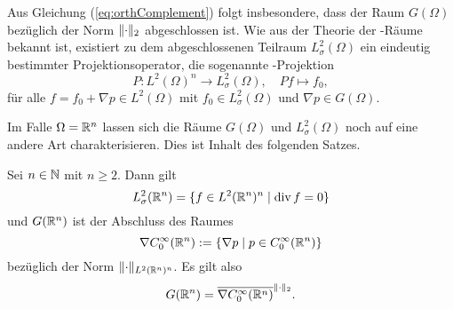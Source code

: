 Aus Gleichung (\ref{eq:orthComplement}) folgt insbesondere, dass der Raum $G(\Omega)$ bezüglich der Norm $\lVert \cdot \rVert_2$ abgeschlossen ist.
Wie aus der Theorie der \hilbert\hyp{}Räume bekannt ist, existiert zu dem abgeschlossenen Teilraum $L_\sigma^2(\Omega)$ ein eindeutig bestimmter Projektionsoperator, die sogenannte \helmholtz\hyp{}Projektion
$$
P \colon L^2(\Omega)^n \to L_\sigma^2(\Omega),\quad Pf \mapsto f_0,
$$
für alle $f = f_0 + \nabla p \in L^2(\Omega)$ mit $f_0 \in L_\sigma^2(\Omega)$ und $\nabla p \in G(\Omega)$.

Im Falle $\Omega = \mathbb{R}^n$ lassen sich die Räume $G(\Omega)$ und $L_\sigma^2(\Omega)$ noch auf eine andere Art charakterisieren.
Dies ist Inhalt des folgenden Satzes.

\begin{thm}
  Sei $n \in \mathbb{N}$ mit $n \geq 2$.
  Dann gilt
  \begin{equation}
    \label{eq:LCharacterization}
    L_\sigma^2(\mathbb{R}^n) = \{ f \in L^2(\mathbb{R}^n)^n \mid \mathrm{div\,} f = 0 \}
  \end{equation}
  und $G(\mathbb{R}^n)$ ist der Abschluss des Raumes
  $$
  \nabla C_0^\infty(\mathbb{R}^n) := \{ \nabla p \mid p \in C_0^\infty(\mathbb{R}^n) \}
  $$
  bezüglich der Norm $\lVert \cdot \rVert_{L^2(\mathbb{R}^n)^n}$.
  Es gilt also
  \begin{equation}
    \label{eq:GCharacterization}
    G(\mathbb{R}^n) = \overline{\nabla C_0^\infty(\mathbb{R}^n)}^{\lVert \cdot \rVert_2}.
  \end{equation}
\end{thm}

